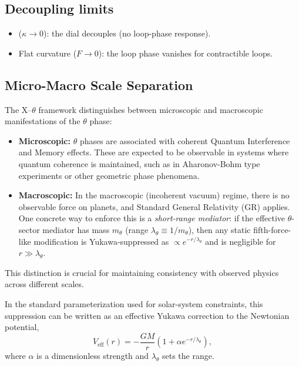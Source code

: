 ﻿\documentclass[twocolumn,aps,prd,nofootinbib]{revtex4-2}
\begin{document}
\subsection{Decoupling limits}
\begin{itemize}
    \item ($\kappa \to 0$): the dial decouples (no loop-phase response).
    \item Flat curvature ($F\to 0$): the loop phase vanishes for contractible loops.
\end{itemize}

\subsection{Micro-Macro Scale Separation}
The X--$\theta$ framework distinguishes between microscopic and macroscopic manifestations of the $\theta$ phase:
\begin{itemize}
    \item \textbf{Microscopic:} $\theta$ phases are associated with coherent Quantum Interference and Memory effects. These are expected to be observable in systems where quantum coherence is maintained, such as in Aharonov-Bohm type experiments or other geometric phase phenomena.
    \item \textbf{Macroscopic:} In the macroscopic (incoherent vacuum) regime, there is no observable force on planets, and Standard General Relativity (GR) applies. One concrete way to enforce this is a \emph{short-range mediator}: if the effective $\theta$-sector mediator has mass $m_\theta$ (range $\lambda_\theta\equiv 1/m_\theta$), then any static fifth-force-like modification is Yukawa-suppressed as $\propto e^{-r/\lambda_\theta}$ and is negligible for $r\gg\lambda_\theta$.
\end{itemize}
This distinction is crucial for maintaining consistency with observed physics across different scales.

In the standard parameterization used for solar-system constraints, this suppression can be written as an effective Yukawa correction to the Newtonian potential,
\begin{equation}
V_{\text{eff}}(r) = -\frac{GM}{r} \left( 1 + \alpha e^{-r/\lambda_\theta} \right),
\end{equation}
where $\alpha$ is a dimensionless strength and $\lambda_\theta$ sets the range.
\end{document}
